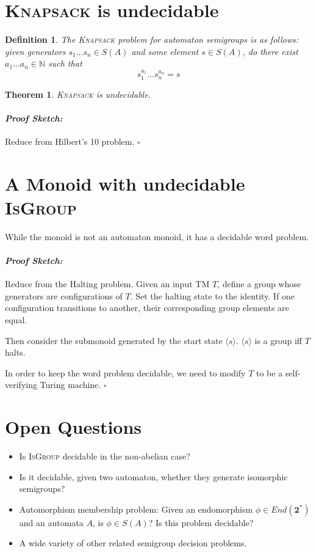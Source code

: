 \documentclass[a0]{a0poster}
\theoremstyle{pleasant}
\newtheorem{theorem}{Theorem}
\newtheorem{definition}{Definition}
\newenvironment{proofsketch}{\paragraph{\Large \normalfont \textit{Proof Sketch:}}}{\hfill$\square$}
\newcommand{\0}{\underline{0}}
\newcommand{\1}{\underline{1}}
\newcommand{\2}{\underline{2}}
\newcommand{\N}{\mathbb{N}}
\begin{document}
\begin{multicols}{3}
\section*{\textsc{Knapsack} is undecidable}

\begin{definition}
The \textsc{Knapsack} problem for automaton semigroups is as follows: given generators $s_1\ldots s_n \in S(A)$ and some element $s \in S(A)$, do there exist $a_1\ldots a_n \in \N$ such that \[s_1^{a_1}\ldots s_n^{a_n} = s \]
\end{definition}

\begin{theorem}
\textsc{Knapsack} is undecidable.
\end{theorem}

\begin{proofsketch}
Reduce from Hilbert's 10 problem.
\end{proofsketch}

\section*{A Monoid with undecidable \textsc{IsGroup}}

While the monoid is not an automaton monoid, it has a decidable word problem.

\begin{proofsketch}
Reduce from the Halting problem. Given an input TM $T$, define a group whose generators are configurations of $T$. Set the halting state to the identity. If one configuration transitions to another, their corresponding group elements are equal.

Then consider the submonoid generated by the start state $\langle s \rangle$. $\langle s \rangle$ is a group iff $T$ halts.

In order to keep the word problem decidable, we need to modify $T$ to be a self-verifying Turing machine.
\end{proofsketch}

\section*{Open Questions}

\begin{itemize}
\item Is \textsc{IsGroup} decidable in the non-abelian case?
\item Is it decidable, given two automaton, whether they generate isomorphic semigroups? 
\item Automorphism membership problem: Given an endomorphism $\phi \in End(\textbf{2}^*)$ and an automata $A$, is $\phi \in S(A)$? Is this problem decidable?
\item A wide variety of other related semigroup decision problems.
\end{itemize}


\end{multicols}
\end{document}
